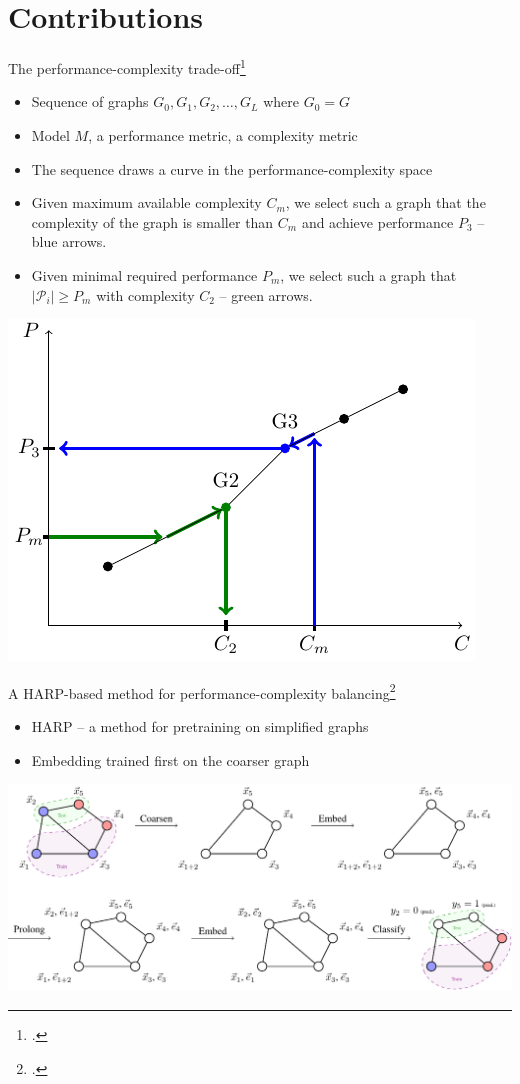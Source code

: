 \documentclass[10pt]{beamer}
\begin{document}
\section{Contributions}

\begin{frame}{The performance-complexity trade-off\footcite{prochazka_scalable_2022, dedic_balancing_2023, dedic_balancing_2024}}
	\begin{itemize}
		\item<1|only@1> Sequence of graphs \( G_0, G_1, G_2, \dots, G_L \) where \( G_0 = G \)
		\item<1|only@1> Model \( M \), a performance metric, a complexity metric
		\item<1|only@1> The sequence draws a curve in the performance-complexity space
		\item<2|only@2> Given maximum available complexity $C_m$, we select such a graph that the complexity of the graph is smaller than $C_m$ and achieve performance $P_3$ -- blue arrows.
		\item<2|only@2> Given minimal required performance $P_m$, we select such a graph that $|\mathcal{P}_i|\ge P_m$ with complexity $C_2$ -- green arrows.
	\end{itemize}

	\vfill

	\centering
	\includegraphics[width=0.6\linewidth]{images/performance-complexity-schema/performance-complexity-schema.pdf}
\end{frame}

\begin{frame}{A HARP-based method for performance-complexity balancing\footcite{dedic_balancing_2024}}
	\begin{itemize}
		\item HARP -- a method for pretraining on simplified graphs
		\item Embedding trained first on the coarser graph
	\end{itemize}

	\vfill

	\centering
	\includegraphics[width=0.9\linewidth]{images/harp-overview/harp-overview.pdf}
\end{frame}
\end{document}
